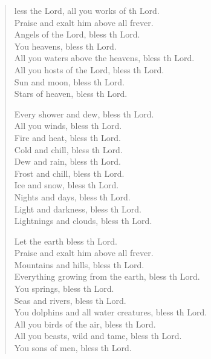 \settowidth{\versewidth}{Let us bless the Father, and the Son, and the Holy Spirit. *}
\begin{verse}%
  \begin{patverse}
    less the Lord, all you works of th Lord.\Med\\
Praise and exalt him above all frever.\\
Angels of the Lord, bless th Lord.\Med\\
You heavens, bless th Lord.\\
All you waters above the heavens, bless th Lord.\Med\\
All you hosts of the Lord, bless th Lord.\\
Sun and moon, bless th Lord.\Med\\
Stars of heaven, bless th Lord.

Every shower and dew, bless th Lord.\Med\\
All you winds, bless th Lord.\\
Fire and heat, bless th Lord.\Med\\
Cold and chill, bless th Lord.\\
Dew and rain, bless th Lord.\Med\\
Frost and chill, bless th Lord.\\
Ice and snow, bless th Lord.\Med\\
Nights and days, bless th Lord.\\
Light and darkness, bless th Lord.\Med\\
Lightnings and clouds, bless th Lord.

Let the earth bless th Lord.\Med\\
Praise and exalt him above all frever.\\
Mountains and hills, bless th Lord.\Med\\
Everything growing from the earth, bless th Lord.\\
You springs, bless th Lord.\Med\\
Seas and rivers, bless th Lord.\\
You dolphins and all water creatures, bless th Lord.\Med\\
All you birds of the air, bless th Lord.\\
All you beasts, wild and tame, bless th Lord.\Med\\
You sons of men, bless th Lord.


\end{patverse}
\end{verse}
